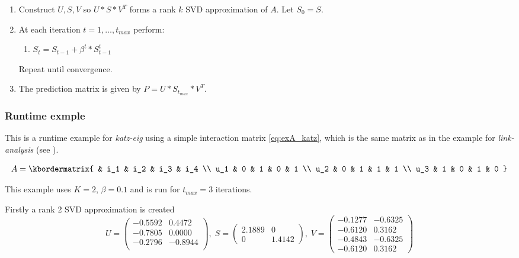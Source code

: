 \begin{enumerate}
    \item Construct $U, S, V$ so $U * S * V^T$ forms a rank $k$ SVD approximation of $A$. Let $S_0 = S$.

    \item At each iteration $t = 1, \ldots, t_{max}$ perform:

        \begin{enumerate}
            \item $S_t = S_{t - 1} + \beta^t * S_{t - 1}^t$
        \end{enumerate}

        Repeat until convergence.

    \item The prediction matrix is given by $P = U * S_{t_{max}} * V^T$.

\end{enumerate}



\subsubsection{Runtime exmple}

This is a runtime example for \textit{katz-eig} using a simple interaction matrix \eqref{eq:exA_katz}, which is the same matrix as in the example for \textit{link-analysis} (see ).

\begin{equation}\label{eq:exA_katz}
  A = \kbordermatrix{
    &    i_1 & i_2 & i_3 & i_4 \\
    u_1 & 0   & 1   & 0   & 1  \\
    u_2 & 0   & 1   & 1   & 1  \\
    u_3 & 1   & 0   & 1   & 0
  }
\end{equation}

This example uses $K = 2$, $\beta = 0.1$ and is run for $t_{max} = 3$ iterations.

Firstly a rank 2 SVD approximation is created
\[
U = \begin{pmatrix}
    -0.5592 &  0.4472 \\
    -0.7805 &  0.0000 \\
    -0.2796 & -0.8944 \\
\end{pmatrix},
\;
S = \begin{pmatrix}
    2.1889  &      0 \\
         0  & 1.4142
\end{pmatrix},
\;
V = \begin{pmatrix}
   -0.1277 & -0.6325 \\
   -0.6120 &  0.3162 \\
   -0.4843 & -0.6325 \\
   -0.6120 &  0.3162
\end{pmatrix}
\]


